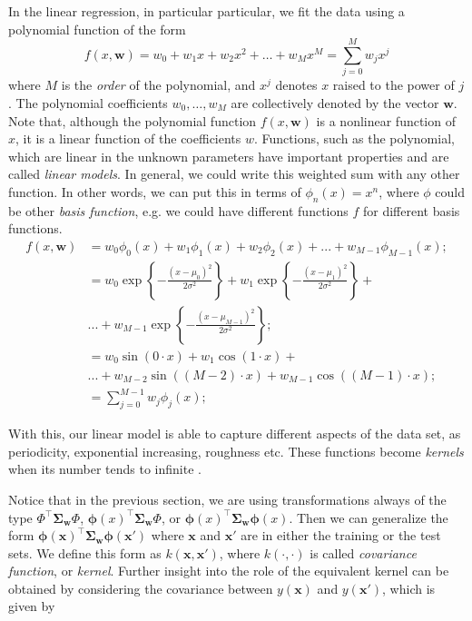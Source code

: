 \documentclass[11pt]{article} %
\begin{document}
In the linear regression, in particular particular, we fit the data using a polynomial function of the form
%
\begin{equation}
      f(x, \mathbf{w})=w_{0}+w_{1} x+w_{2} x^{2}+\ldots+w_{M} x^{M}=\sum_{j=0}^{M} w_{j} x^{j}
      \label{eq:intro-poly}
\end{equation}
%
where $M$ is the \textit{order} of the polynomial, and $x^j$ denotes $x$ raised to the power of $j$. The polynomial coefficients $w_0, \dots , w_M$ are collectively denoted by the vector $\mathbf{w}$. Note that, although the polynomial function $f(x, \mathbf{w})$ is a nonlinear function of $x$, it is a linear function of the coefficients $w$. Functions, such as the polynomial, which are linear in the unknown parameters have important properties and are called \textit{linear models}. In general, we could write this weighted sum with any other function. In other words, we can put this in terms of $\phi_n(x)=x^n$, where $\phi$ could be other \textit{basis function}, e.g. we could have different functions $f$ for different basis functions.
%
\begin{align*}
      f(x,\mathbf{w}) &= w_0 \phi_0(x) +w_1 \phi_1(x) +w_2 \phi_2(x)  + ... + w_{M-1} \phi_{M-1}(x); \\
                        &= w_0 \exp\left\{ - \frac{(x-\mu_0)^2}{2\sigma^2}\right\} + w_1  \exp\left\{ - \frac{(x-\mu_1)^2}{2\sigma^2}\right\} + \\ & ... + w_{M-1} \exp\left\{ - \frac{(x-\mu_{M-1})^2}{2\sigma^2}\right\}; \\
                        &= w_0 \sin(0 \cdot x) + w_1 \cos(1 \cdot x) + \\ &... + w_{M-2} \sin((M-2) \cdot x) + w_{M-1} \cos((M-1) \cdot x); \\
                        &=\sum_{j=0}^{M-1} w_{j} \phi_{j}(x);
\end{align*}
%

With this, our linear model is able to capture different aspects of the data set, as periodicity, exponential increasing, roughness etc.  These functions become \textit{kernels} when its number tends to infinite \cite{mackay1998introduction}.

Notice that in the previous section, we are using transformations always of the type $\Phi^{\top} \boldsymbol{\Sigma}_\mathbf{w} \Phi$, $\boldsymbol{\phi}(x)^{\top} \boldsymbol{\Sigma}_\mathbf{w} \Phi$, or $\boldsymbol{\phi}(x)^{\top} \boldsymbol{\Sigma}_\mathbf{w} \boldsymbol{\phi}(x)$. Then we can generalize the form $\boldsymbol{\phi}(\mathbf{x})^\top \boldsymbol{\Sigma}_\mathbf{w}\boldsymbol{\phi}(\mathbf{x'})$ where $\mathbf{x}$ and $\mathbf{x'}$ are in either the training or the test sets. We define this form as $k(\mathbf{x},\mathbf{x'})$, where $k(\cdot,\cdot)$ is called \textit{covariance function}, or \textit{kernel}. Further insight into the role of the equivalent kernel can be obtained by considering the covariance between $y(\mathbf{x})$ and $y(\mathbf{x'})$, which is given by
\end{document}

